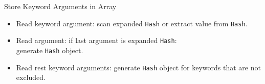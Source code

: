 \documentclass[xcolor=dvipsname,handout]{beamer} %
\begin{document}
\begin{frame}{Store Keyword Arguments in Array}
\begin{itemize}
    \item Read keyword argument: scan expanded \lstinline{Hash} or extract value from \lstinline{Hash}.
    \item Read argument: if last argument is expanded \lstinline{Hash}: \\ generate \lstinline{Hash} object.
    \item Read rest keyword arguments: generate \lstinline{Hash} object for keywords that are not excluded.
\end{itemize}
\end{frame}
\end{document}
